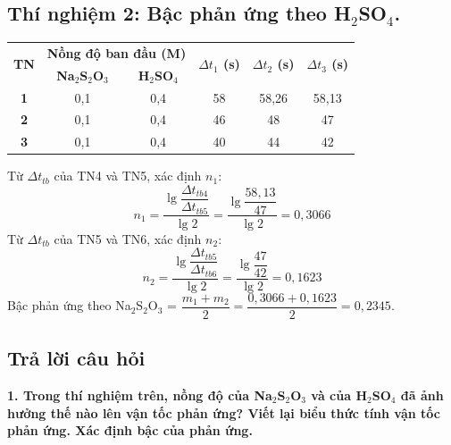 \documentclass[12pt,a4paper]{report}
\begin{document}
\subsection*{Thí nghiệm 2: Bậc phản ứng theo H$_2$SO$_4$.}
\begin{table}[h!]
    \centering
    \begin{tabular}{|c|cc|c|c|c|}
    \hline
    \multirow{2}{*}{\textbf{TN}} & \multicolumn{2}{c|}{\textbf{Nồng độ ban đầu (M)}}                     & \multirow{2}{*}{\textbf{$\Delta t_1$ (s)}} & \multirow{2}{*}{\textbf{$\Delta t_2$ (s)}} & \multirow{2}{*}{\textbf{$\Delta t_3$ (s)}} \\ \cline{2-3}
                                 & \multicolumn{1}{c|}{\textbf{Na$_2$S$_2$O$_3$}} & \textbf{H$_2$SO$_4$} &                                            &                                            &                                            \\ \hline
    \textbf{1}                   & \multicolumn{1}{c|}{0,1}                       & 0,4                  & 58                                         & 58,26                                      & 58,13                                      \\ \hline
    \textbf{2}                   & \multicolumn{1}{c|}{0,1}                       & 0,4                  & 46                                         & 48                                         & 47                                         \\ \hline
    \textbf{3}                   & \multicolumn{1}{c|}{0,1}                       & 0,4                  & 40                                         & 44                                         & 42                                       \\ \hline
    \end{tabular}
\end{table}
\noindent Từ $\Delta t_{tb}$ của TN4 và TN5, xác định $n_1$:
\[
    n_1 = \frac{\lg \dfrac{\Delta t_{tb4}}{\Delta t_{tb5}}}{\lg2} = \frac{\lg \dfrac{58,13}{47}}{\lg2} = 0,3066 
\]
Từ $\Delta t_{tb}$ của TN5 và TN6, xác định $n_2$:
\[
    n_2 = \frac{\lg \dfrac{\Delta t_{tb5}}{\Delta t_{tb6}}}{\lg2} = \frac{\lg \dfrac{47}{42}}{\lg2} = 0,1623
\]
Bậc phản ứng theo Na$_2$S$_2$O$_3$ = $\dfrac{m_1 + m_2}{2} = \dfrac{0,3066+0,1623}{2} = 0,2345$.
\subsection{Trả lời câu hỏi}
\noindent\textbf{1. Trong thí nghiệm trên, nồng độ của Na$_2$S$_2$O$_3$ và của H$_2$SO$_4$ đã ảnh hưởng thế nào lên vận tốc phản ứng? Viết lại biểu thức tính vận tốc phản ứng. Xác định bậc của phản ứng.}
\end{document}
